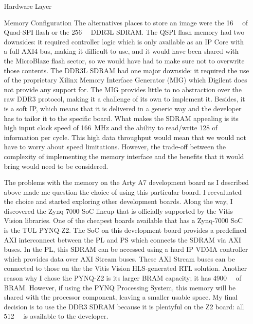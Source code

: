 \documentclass{matthijs}
\begin{document}
\begin{hoofdstuk}{Hardware Layer}
\begin{paragraaf}{Memory Configuration}
			The alternatives places to store an image were the \qty{16}{\mebi\byte} of Quad-SPI flash or the \qty{256}{\mega\byte} DDR3L SDRAM.
			The QSPI flash memory had two downsides: it required controller logic which is only available as an IP Core with a full AXI4 bus, making it difficult to use, and it would have been shared with the MicroBlaze flash sector, so we would have had to make sure not to overwrite those contents.
			The DDR3L SDRAM had one major downside: it required the use of the proprietary Xilinx Memory Interface Generator (MIG) which Digilent does not provide any support for.
			The MIG provides little to no abstraction over the raw DDR3 protocol, making it a challenge of its own to implement it.
			Besides, it is a soft IP, which means that it is delivered in a generic way and the developer has to tailor it to the specific board.
			What makes the SDRAM appealing is its high input clock speed of \qty{166}{\mega\hertz} and the ability to read/write \qty{128}{\bit} of information per cycle.
			This high data throughput would mean that we would not have to worry about speed limitations.
			However, the trade-off between the complexity of implementing the memory interface and the benefits that it would bring would need to be considered.

			\bigskip

			The problems with the memory on the Arty A7 development board as I described above made me question the choice of using this particular board.
			I reevaluated the choice and started exploring other development boards.
			Along the way, I discovered the Zynq-7000 SoC lineup that is officially supported by the Vitis Vision libraries.
			One of the cheapest boards available that has a Zynq-7000 SoC is the TUL PYNQ-Z2.
			The SoC on this development board provides a predefined AXI interconnect between the PL and PS which connects the SDRAM via AXI buses.
			In the PL, this SDRAM can be accessed using a hard IP VDMA controller which provides data over AXI Stream buses.
			These AXI Stream buses can be connected to those on the the Vitis Vision HLS-generated RTL solution.
			Another reason why I chose the PYNQ-Z2 is its larger BRAM capacity; it has \qty{4900}{\kibi\bit} of BRAM.
			However, if using the PYNQ Processing System, this memory will be shared with the processor component, leaving a smaller usable space.
			My final decision is to use the DDR3 SDRAM because it is plentyful on the Z2 board: all \qty{512}{\mega\byte} is available to the developer.

			\bigskip


\end{paragraaf}
\end{hoofdstuk}
\end{document}
